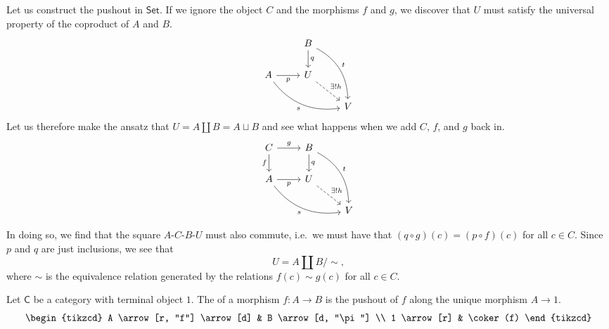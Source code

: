 \documentclass[notes.tex]{subfiles}
\begin{document}
\begin{example}
  Let us construct the pushout in $\mathsf{Set}$. If we ignore the object $C$ and the morphisms $f$ and $g$, we discover that $U$ must satisfy the universal property of the coproduct of $A$ and $B$.
  \begin{equation*}
    \begin{tikzcd}
      & B \arrow[d, "q"] \arrow[ddr, bend left, "t"] & \\
      A \arrow[drr, bend right, swap, "s"] \arrow[r, swap, "p"] & U \arrow[dr, dashed, "\exists!h"] & \\
      & & V
    \end{tikzcd}
  \end{equation*}
  Let us therefore make the ansatz that $U = A \amalg B = A \sqcup B$ and see what happens when we add $C$, $f$, and $g$ back in.
  \begin{equation*}
    \begin{tikzcd}
      C \arrow[r, "g"] \arrow[d, swap, "f"] & B \arrow[d, "q"] \arrow[ddr, bend left, "t"] & \\
      A \arrow[drr, bend right, swap, "s"] \arrow[r, swap, "p"] & U \arrow[dr, dashed, "\exists!h"] & \\
      & & V
    \end{tikzcd}
  \end{equation*}

  In doing so, we find that the square $A$-$C$-$B$-$U$ must also commute, i.e.\ we must have that $(q \circ g) (c) = (p \circ f)(c)$ for all $c \in C$. Since $p$ and $q$ are just inclusions, we see that
  \begin{equation*}
    U = A \amalg B / \sim,
  \end{equation*}
  where $\sim$ is the equivalence relation generated by the relations $f(c) \sim g(c)$ for all $c\in C$.
\end{example}

\begin{definition}
  \label{def:cokernalofmorphism}
  Let $\mathsf{C}$ be a category with terminal object $1$. The  of a morphism $f\colon A \to B$ is the pushout of $f$ along the unique morphism $A \to 1$.
  \begin{equation*}
    \begin{tikzcd}
      A \arrow[r, "f"] \arrow[d] & B \arrow[d, "\pi"] \\
      1 \arrow[r] & \coker(f)
    \end{tikzcd}
  \end{equation*}
\end{definition}
\end{document}
